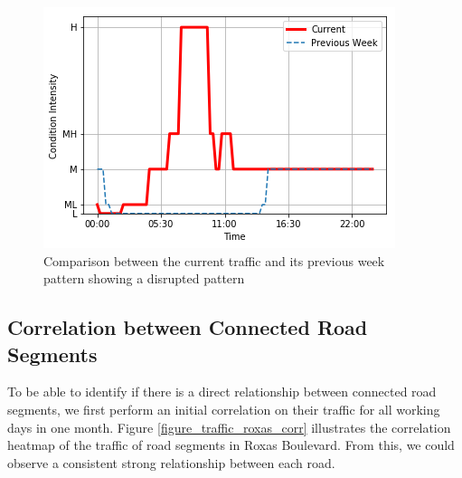 \begin{figure}
  \includegraphics[width=\linewidth]{figures/figure_traffic_disrupted.png}
  \caption{Comparison between the current traffic and its previous week pattern showing a disrupted pattern}
  \label{figure_traffic_disrupted}
\end{figure}


\subsection{Correlation between Connected Road Segments}
To be able to identify if there is a direct relationship between connected road segments, we first perform an initial correlation on their traffic for all working days in one month. Figure \ref{figure_traffic_roxas_corr} illustrates the correlation heatmap of the traffic of road segments in Roxas Boulevard. From this, we could observe a consistent strong relationship between each road. 




